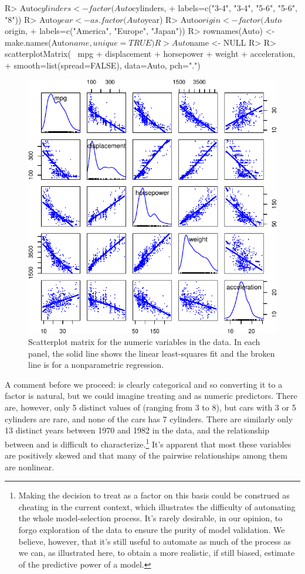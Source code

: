 \documentclass[
]{jss}
\begin{document}
\begin{CodeChunk}
\begin{CodeInput}
R> Auto$cylinders <- factor(Auto$cylinders,
+                          labels=c("3-4", "3-4", "5-6", "5-6", "8"))
R> Auto$year <- as.factor(Auto$year)
R> Auto$origin <- factor(Auto$origin,
+                       labels=c("America", "Europe", "Japan"))
R> rownames(Auto) <- make.names(Auto$name, unique=TRUE)
R> Auto$name <- NULL
R> 
R> scatterplotMatrix(~ mpg + displacement + horsepower + weight + acceleration, 
+                   smooth=list(spread=FALSE), data=Auto, pch=".")
\end{CodeInput}
\begin{figure}

{\centering \includegraphics[width=0.6\linewidth]{JSS-article-3_files/figure-latex/Auto-explore-1} 

}

\caption[Scatterplot matrix for the numeric variables in the  data]{Scatterplot matrix for the numeric variables in the  data. In each panel, the solid line shows the linear least-squares fit and the broken line is for a nonparametric regression.}\label{fig:Auto-explore}
\end{figure}
\end{CodeChunk}

A comment before we proceed:  is clearly categorical and so
converting it to a factor is natural, but we could imagine treating
 and  as numeric predictors. There are,
however, only 5 distinct values of  (ranging from 3 to
8), but cars with 3 or 5 cylinders are rare, and none of the cars has 7
cylinders. There are similarly only 13 distinct years between 1970 and
1982 in the data, and the relationship between  and
 is difficult to characterize.\footnote{Making the decision
  to treat  as a factor on this basis could be construed as
  cheating in the current context, which illustrates the difficulty of
  automating the whole model-selection process. It's rarely desirable,
  in our opinion, to forgo exploration of the data to ensure the purity
  of model validation. We believe, however, that it's still useful to
  automate as much of the process as we can, as illustrated here, to
  obtain a more realistic, if still biased, estimate of the predictive
  power of a model.} It's apparent that most these variables are
positively skewed and that many of the pairwise relationships among them
are nonlinear.
\end{document}
